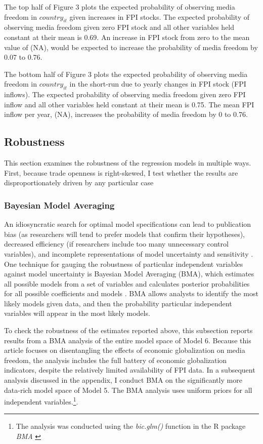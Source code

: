 \documentclass[12pt,a4paper]{article}\usepackage[]{graphicx}\usepackage[]{color}
\begin{document}
The top half of Figure 3 plots the expected probability of observing media freedom in $country_{it}$ given increases in FPI stocks. The expected probability of observing media freedom given zero FPI stock and all other variables held constant at their mean is 0.69. An increase in FPI stock from zero to the mean value of (NA), would be expected to increase the probability of media freedom by 0.07 to 0.76.

The bottom half of Figure 3 plots the expected probability of observing media freedom in $country_{it}$ in the short-run due to yearly changes in FPI stock (FPI inflows). The expected probability of observing media freedom given zero FPI inflow and all other variables held constant at their mean is 0.75. The mean FPI inflow per year, (NA), increases the probability of media freedom by 0 to 0.76.


\subsection{Robustness}

This section examines the robustness of the regression models in multiple ways. First, because trade openness is right-skewed, I test whether the results are disproportionately driven by any particular case

\subsubsection{Bayesian Model Averaging}

An idiosyncratic search for optimal model specifications can lead to publication bias (as researchers will tend to prefer models that confirm their hypotheses), decreased efficiency (if researchers include too many unnecessary control variables), and incomplete representations of model uncertainty and sensitivity \parencite[2]{Montgomery:2010fc}. One technique for gauging the robustness of particular independent variables against model uncertainty is Bayesian Model Averaging (BMA), which estimates all possible models from a set of variables and calculates posterior probabilities for all possible coefficients and models \parencite[4]{Montgomery:2010fc}. BMA allows analysts to identify the most likely models given data, and then the probability particular independent variables will appear in the most likely models.

To check the robustness of the estimates reported above, this subsection reports results from a BMA analysis of the entire model space of Model 6. Because this article focuses on disentangling the effects of economic globalization on media freedom, the analysis includes the full battery of economic globalization indicators, despite the relatively limited availability of FPI data. In a subsequent analysis discussed in the appendix, I conduct BMA on the significantly more data-rich model space of Model 5. The BMA analysis uses uniform priors for all independent variables.\footnote{The analysis was conducted using the \emph{bic.glm()} function in the R package \emph{BMA} \parencite{BMABayesianModel:us}}.
\end{document}
